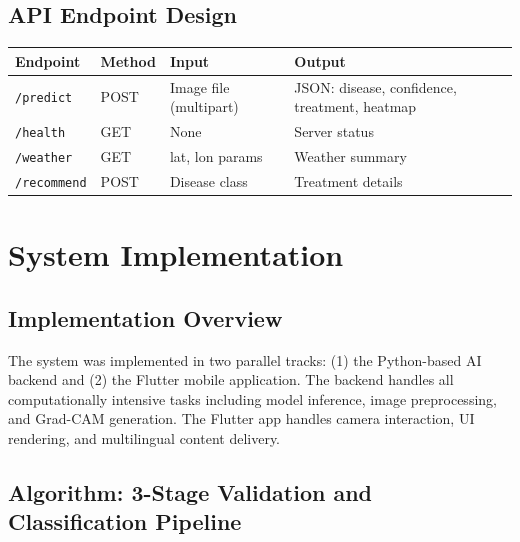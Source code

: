 \documentclass[12pt,a4paper]{report}
\begin{document}
\section{API Endpoint Design}

\begin{center}
\begin{tabular}{|p{3cm}|p{2cm}|p{3cm}|p{4cm}|}
\hline
\textbf{Endpoint} & \textbf{Method} & \textbf{Input} & \textbf{Output} \\
\hline
\texttt{/predict} & POST & Image file (multipart) & JSON: disease, confidence, treatment, heatmap \\
\hline
\texttt{/health} & GET & None & Server status \\
\hline
\texttt{/weather} & GET & lat, lon params & Weather summary \\
\hline
\texttt{/recommend} & POST & Disease class & Treatment details \\
\hline
\end{tabular}
\end{center}

\chapter{System Implementation}

\section{Implementation Overview}
The system was implemented in two parallel tracks: (1) the Python-based AI backend and (2) the Flutter mobile application. The backend handles all computationally intensive tasks including model inference, image preprocessing, and Grad-CAM generation. The Flutter app handles camera interaction, UI rendering, and multilingual content delivery.

\section{Algorithm: 3-Stage Validation and Classification Pipeline}
\end{document}
